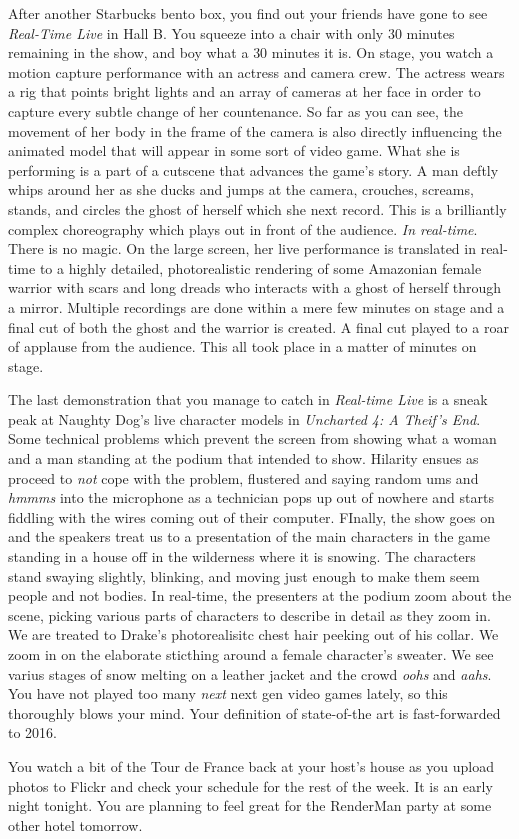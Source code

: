\documentclass[../main.tex]{subfiles}
\begin{document}
After another Starbucks bento box, you find out your friends have gone to see \textit{Real-Time Live} in Hall B. You squeeze into a chair with only 30 minutes remaining in the show, and boy what a 30 minutes it is. On stage, you watch a motion capture performance with an actress and camera crew. The actress wears a rig that points bright lights and an array of cameras at her face in order to capture every subtle change of her countenance.  So far as you can see, the movement of her body in the frame of the camera is also directly influencing the animated model that will appear in some sort of video game. What she is performing is a part of a cutscene that advances the game's story. A man deftly whips around her as she ducks and jumps at the camera, crouches, screams, stands, and circles the ghost of herself which she next record. This is a brilliantly complex choreography which plays out in front of the audience. \textit{In real-time}. There is no magic. On the large screen, her live performance is translated in real-time to a highly detailed, photorealistic rendering of some Amazonian female warrior with scars and long dreads who interacts with a ghost of herself through a mirror. Multiple recordings are done within a mere few minutes on stage and a final cut of both the ghost and the warrior is created. A final cut played to a roar of applause from the audience. This all took place in a matter of minutes on stage.

The last demonstration that you manage to catch in \textit{Real-time Live} is a sneak peak at Naughty Dog's live character models in \textit{Uncharted 4: A Theif's End}. Some technical problems which prevent the screen from showing what a woman and a man standing at the podium that intended to show. Hilarity ensues as proceed to \textit{not} cope with the problem, flustered and saying random ums and \textit{hmmms} into the microphone as a technician pops up out of nowhere and starts fiddling with the wires coming out of their computer. FInally, the show goes on and the speakers treat us to a presentation of the main characters in the game standing in a house off in the wilderness where it is snowing. The characters stand swaying slightly, blinking, and moving just enough to make them seem people and not bodies. In real-time, the presenters at the podium zoom about the scene, picking various parts of characters to describe in detail as they zoom in. We are treated to Drake's photorealisitc chest hair peeking out of his collar. We zoom in on the elaborate sticthing around a female character's sweater. We see varius stages of snow melting on a leather jacket and the crowd \textit{oohs} and \textit{aahs}. You have not played too many \textit{next} next gen video games lately, so this thoroughly blows your mind. Your definition of state-of-the art is fast-forwarded to 2016.

You watch a bit of the Tour de France back at your host's house as you upload photos to Flickr and check your schedule for the rest of the week. It is an early night tonight. You are planning to feel great for the RenderMan party at some other hotel tomorrow.
\end{document}
